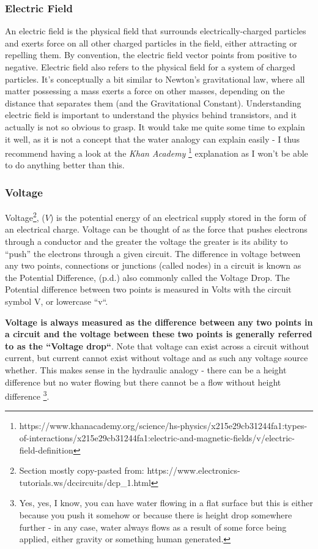 \subsubsection{Electric Field}

An electric field is the physical field that surrounds electrically-charged particles and exerts force on all other charged particles in the field, either attracting or repelling them. By convention, the electric field vector  points from positive to negative. Electric field also refers to the physical field for a system of charged particles. It's conceptually a bit similar to Newton's gravitational law, where all matter possessing a mass exerts a force on other masses, depending on the distance that separates them (and the Gravitational Constant). Understanding electric field is important to understand the physics behind transistors, and it actually is not so obvious to grasp. It would take me quite some time to explain it well, as it is not a concept that the water analogy can explain easily - I thus recommend having a look at the \textit{Khan Academy} \footnote{https://www.khanacademy.org/science/hs-physics/x215e29cb31244fa1:types-of-interactions/x215e29cb31244fa1:electric-and-magnetic-fields/v/electric-field-definition} explanation as I won't be able to do anything better than this. 

\subsubsection{Voltage}

Voltage\footnote{Section mostly copy-pasted from: https://www.electronics-tutorials.ws/dccircuits/dcp\_1.html}, ($V$) is the potential energy of an electrical supply stored in the form of an electrical charge. Voltage can be thought of as the force that pushes electrons through a conductor and the greater the voltage the greater is its ability to “push” the electrons through a given circuit. The difference in voltage between any two points, connections or junctions (called nodes) in a circuit is known as the Potential Difference, (p.d.) also commonly called the Voltage Drop. The Potential difference between two points is measured in Volts with the circuit symbol V, or lowercase “v“.

\textbf{Voltage is always measured as the difference between any two points in a circuit and the voltage between these two points is generally referred to as the “Voltage drop“}. Note that voltage can exist across a circuit without current, but current cannot exist without voltage and as such any voltage source whether. This makes sense in the hydraulic analogy - there can be a height difference but no water flowing but there cannot be a flow without height difference \footnote{Yes, yes, I know, you can have water flowing in a flat surface but this is either because you push it somehow or because there is height drop somewhere further - in any case, water always flows as a result of some force being applied, either gravity or something human generated.}. 

